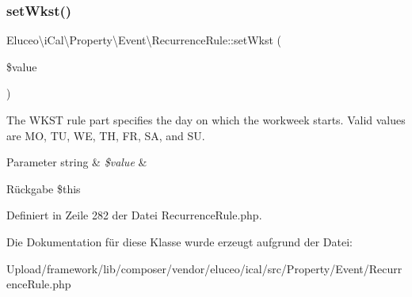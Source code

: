 \subsubsection{\texorpdfstring{set\+Wkst()}{setWkst()}\hspace{0.1cm}{\footnotesize\ttfamily [3/3]}}
{\footnotesize\ttfamily Eluceo\textbackslash{}i\+Cal\textbackslash{}\+Property\textbackslash{}\+Event\textbackslash{}\+Recurrence\+Rule\+::set\+Wkst (\begin{DoxyParamCaption}\item[{}]{\$value }\end{DoxyParamCaption})}

The W\+K\+ST rule part specifies the day on which the workweek starts. Valid values are MO, TU, WE, TH, FR, SA, and SU.


\begin{DoxyParams}[1]{Parameter}
string & {\em \$value} & \\
\hline
\end{DoxyParams}
\begin{DoxyReturn}{Rückgabe}
\$this 
\end{DoxyReturn}


Definiert in Zeile 282 der Datei Recurrence\+Rule.\+php.



Die Dokumentation für diese Klasse wurde erzeugt aufgrund der Datei\+:\begin{DoxyCompactItemize}
\item 
Upload/framework/lib/composer/vendor/eluceo/ical/src/\+Property/\+Event/Recurrence\+Rule.\+php\end{DoxyCompactItemize}
